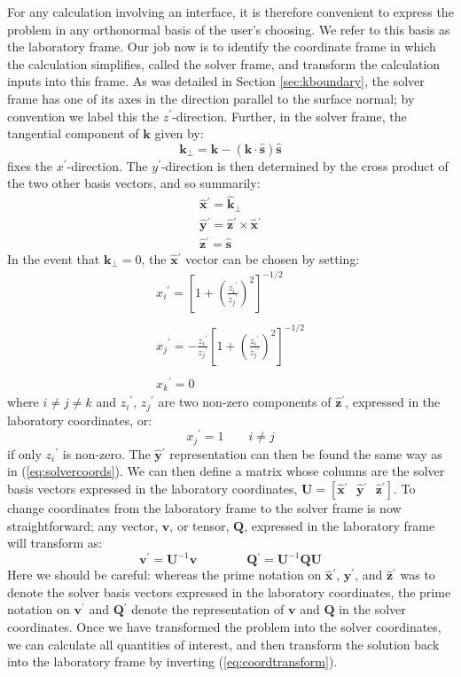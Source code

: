 \documentclass[11pt, reqno]{book}%
\newcounter{ct}
\newcommand{\es}{\begin{equation}}
\newcommand{\ef}{\end{equation} \vspace{0.05in}}
\newcommand{\mbf}{\mathbf}
\newcommand{\mbfh}[1]{\hat{\mbf{#1}}}
\newcommand{\p}{{^\prime}}
\begin{document}
For any calculation involving an interface, it is therefore convenient to express the problem in any orthonormal basis of the user's choosing. We refer to this basis as the laboratory frame. Our job now is to identify the coordinate frame in which the calculation simplifies, called the solver frame, and transform the calculation inputs into this frame. As was detailed in Section \ref{sec:kboundary}, the solver frame has one of its axes in the direction parallel to the surface normal; by convention we label this the $z\p$-direction. Further, in the solver frame, the tangential component of $\mbf{k}$ given by:
\es
\mbf{k}_\perp = \mbf{k}-\left(\mbf{k}\cdot\mbfh{s}\right)\mbfh{s}
\ef
\noindent fixes the $x\p$-direction. The $y\p$-direction is then determined by the cross product of the two other basis vectors, and so summarily:
\es
\begin{array}{l}
\mbfh{x}\p= \mbfh{k}_{\perp} \\
\mbfh{y}\p = \mbfh{z}\p \times \mbfh{x}\p \\
\mbfh{z}\p = \mbfh{s}
\end{array}
\label{eq:solvercoords}
\ef
\noindent In the event that $\mbf{k}_\perp = 0$, the $\mbfh{x}\p$ vector can be chosen by setting:
\es
\begin{array}{l}
x_i\p = \left[1+\left( \frac{z_i\p}{z_j\p} \right)^2  \right]^{-1/2}   \\
\\
x_j\p =  -\frac{z_i\p}{z_j\p}   \left[1+\left( \frac{z_i\p}{z_j\p} \right)^2  \right]^{-1/2} \\
\\
x_k\p = 0
\end{array}
\ef
\noindent where $i\neq j \neq k$ and $z_i\p$, $z_j\p$ are two non-zero components of $\mbfh{z}\p$, expressed in the laboratory coordinates, or:
\es
x_j\p = 1 \quad \quad i \neq j
\ef
\noindent if only $z_i\p$ is non-zero. The $\mbfh{y}\p$ representation can then be found the same way as in (\ref{eq:solvercoords}). We can then define a matrix whose columns are the solver basis vectors expressed in the laboratory coordinates, $\mbf{U}=\left[\mbfh{x}\p \mbox{ }\mbfh{y}\p \mbox{ } \mbfh{z}\p  \right] $. To change coordinates from the laboratory frame to the solver frame is now straightforward; any vector, $\mbf{v}$, or tensor, $\mbf{Q}$, expressed in the laboratory frame will transform as:
\es
\mbf{v}\p = \mbf{U}^{-1} \mbf{v} \quad\quad\quad\quad
\mbf{Q}\p = \mbf{U}^{-1} \mbf{Q}  \mbf{U}
\label{eq:coordtransform}
\ef
\noindent Here we should be careful: whereas the prime notation on $\mbfh{x}\p$, $\mbfh{y}\p$, and $\mbfh{z}\p$ was to denote the solver basis vectors expressed in the laboratory coordinates, the prime notation on $\mbf{v}\p$ and $\mbf{Q}\p$ denote the representation of $\mbf{v}$ and $\mbf{Q}$ in the solver coordinates. Once we have transformed the problem into the solver coordinates, we can calculate all quantities of interest, and then transform the solution back into the laboratory frame by inverting (\ref{eq:coordtransform}).
\end{document}
